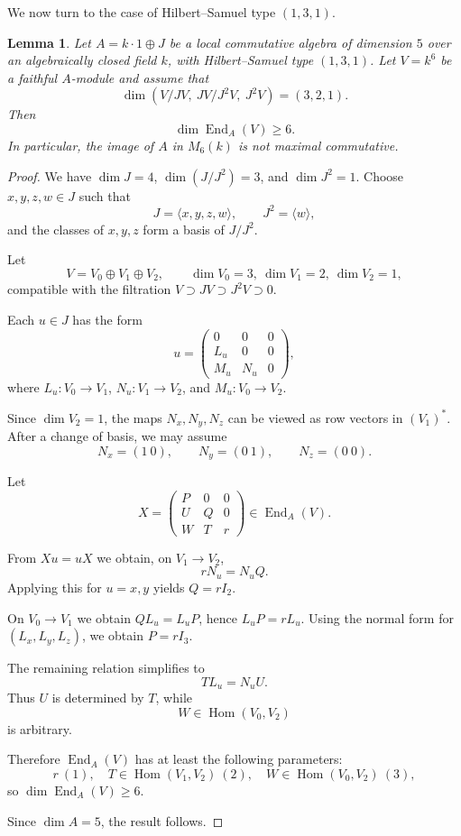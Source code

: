 \documentclass[11pt]{article}
\DeclareMathOperator{\End}{End}
\DeclareMathOperator{\Hom}{Hom}
\theoremstyle{plain}
\newtheorem{lemma}{Lemma}
\theoremstyle{remark}
\begin{document}
We now turn to the case of Hilbert--Samuel type $(1,3,1)$.

\begin{lemma}\label{lem:131-321}
	Let $A = k \cdot 1 \oplus J$ be a local commutative algebra of dimension $5$ over an algebraically closed field $k$, with Hilbert--Samuel type $(1,3,1)$. Let $V = k^6$ be a faithful $A$-module and assume that
	\[
	\dim(V/JV,\ JV/J^2V,\ J^2V)=(3,2,1).
	\]
	Then
	\[
	\dim \End_A(V)\ge 6.
	\]
	In particular, the image of $A$ in $M_6(k)$ is not maximal commutative.
\end{lemma}

\begin{proof}
	We have $\dim J=4$, $\dim(J/J^2)=3$, and $\dim J^2=1$. Choose $x,y,z,w\in J$ such that
	\[
	J=\langle x,y,z,w\rangle,\qquad J^2=\langle w\rangle,
	\]
	and the classes of $x,y,z$ form a basis of $J/J^2$.
	
	Let
	\[
	V=V_0\oplus V_1\oplus V_2,\qquad \dim V_0=3,\ \dim V_1=2,\ \dim V_2=1,
	\]
	compatible with the filtration $V\supset JV\supset J^2V\supset 0$.
	
	Each $u\in J$ has the form
	\[
	u=
	\begin{pmatrix}
		0&0&0\\
		L_u&0&0\\
		M_u&N_u&0
	\end{pmatrix},
	\]
	where $L_u:V_0\to V_1$, $N_u:V_1\to V_2$, and $M_u:V_0\to V_2$.
	
	Since $\dim V_2=1$, the maps $N_x,N_y,N_z$ can be viewed as row vectors in $(V_1)^*$. After a change of basis, we may assume
	\[
	N_x=(1\ 0),\qquad N_y=(0\ 1),\qquad N_z=(0\ 0).
	\]
	
	Let
	\[
	X=
	\begin{pmatrix}
		P&0&0\\
		U&Q&0\\
		W&T&r
	\end{pmatrix}\in \End_A(V).
	\]
	
	From $Xu=uX$ we obtain, on $V_1\to V_2$,
	\[
	rN_u=N_uQ.
	\]
	Applying this for $u=x,y$ yields $Q=rI_2$.
	
	On $V_0\to V_1$ we obtain $QL_u=L_uP$, hence $L_uP=rL_u$. Using the normal form for $(L_x,L_y,L_z)$, we obtain $P=rI_3$.
	
	The remaining relation simplifies to
	\[
	TL_u=N_uU.
	\]
	Thus $U$ is determined by $T$, while
	\[
	W\in \Hom(V_0,V_2)
	\]
	is arbitrary.
	
	Therefore $\End_A(V)$ has at least the following parameters:
	\[
	r\ (1),\quad T\in \Hom(V_1,V_2)\ (2),\quad W\in \Hom(V_0,V_2)\ (3),
	\]
	so $\dim \End_A(V)\ge 6$.
	
	Since $\dim A=5$, the result follows.
\end{proof}
\end{document}
